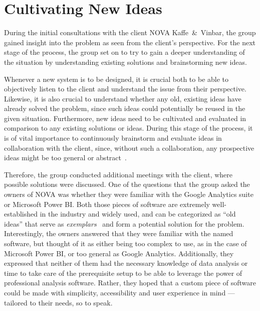 \section{Cultivating New Ideas}\label{sec:cultivating-new-ideas}

During the initial consultations with the client NOVA Kaffe~\&~Vinbar, the group gained insight into the problem as seen
from the client's perspective.
For the next stage of the process, the group set on to try to gain a deeper understanding of the situation by
understanding existing solutions and brainstorming new ideas.

Whenever a new system is to be designed, it is crucial both to be able to objectively listen to the client and
understand the issue from their perspective.
Likewise, it is also crucial to understand whether any old, existing ideas have already solved the problem, since such
ideas could potentially be reused in the given situation.
Furthermore, new ideas need to be cultivated and evaluated in comparison to any existing solutions or ideas.
During this stage of the process, it is of vital importance to continuously brainstorm and evaluate ideas in
collaboration with the client, since, without such a collaboration, any prospective ideas might be too general or
abstract~\cite[32]{mathiassen2018}.

Therefore, the group conducted additional meetings with the client, where possible solutions were discussed.
One of the questions that the group asked the owners of NOVA was whether they were familiar with the Google Analytics
suite or Microsoft Power BI\@.
Both those pieces of software are extremely well-established in the industry and widely used, and can be categorized as
``old ideas'' that serve as \textit{exemplars}~\cite[33]{mathiassen2018} and form a potential solution for the problem.
Interestingly, the owners answered that they were familiar with the named software, but thought of it as either being
too complex to use, as in the case of Microsoft Power BI, or too general as Google Analytics.
Additionally, they expressed that neither of them had the necessary knowledge of data analysis or time to take care of
the prerequisite setup to be able to leverage the power of professional analysis software.
Rather, they hoped that a custom piece of software could be made with simplicity, accessibility and user experience in
mind — tailored to their needs, so to speak.

